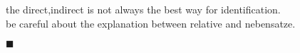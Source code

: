 \documentclass[a4paper,twocolumn,10pt]{article}
\begin{document}
the direct,indirect is not always the best way for identification.\\

be careful about the explanation between relative and nebensatze.\\


\nolinenumbers \vspace{0.2cm}
\begin{center} $\blacksquare$ \end{center}
\linenumbers

\clearpage


\onecolumn
\nolinenumbers



\end{document}
